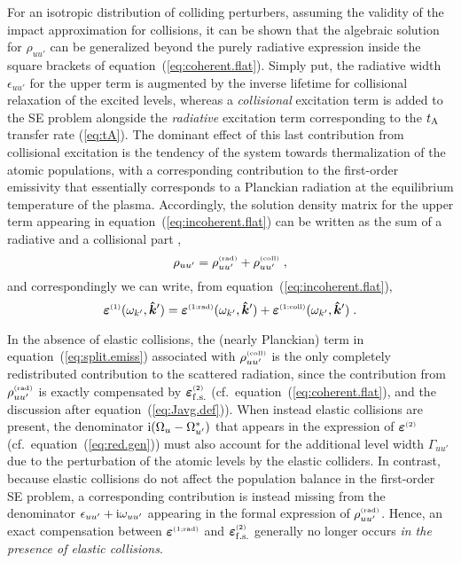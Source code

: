 \documentclass[preprint]{aastex}
\newcommand{\<}{{\kern-5pt}}
\newcommand{\apx}[1]{^{\mbox{\tiny{(#1)}}}}
\begin{document}
For an isotropic 
distribution of colliding perturbers, assuming the validity of the impact
approximation for collisions, it can be shown \cite[see, e.g.,][]{Be13} that 
the algebraic solution for $\rho_{uu'}$ can be generalized beyond the purely 
radiative expression inside the square brackets of 
equation~(\ref{eq:coherent.flat}).
%
Simply put, the radiative width $\epsilon_{uu'}$ for the upper term is augmented 
by the inverse lifetime for collisional relaxation of the excited levels, 
whereas a \emph{collisional} excitation term is added to the SE problem
alongside the \emph{radiative} excitation term corresponding to the $t_{\rm A}$ 
transfer rate (\ref{eq:tA}). The 
dominant effect of this last contribution from collisional excitation is
the tendency of the system towards thermalization of the atomic populations, 
with a corresponding contribution to the first-order emissivity that essentially 
corresponds to a Planckian radiation at the equilibrium temperature of the plasma.
Accordingly, the solution density matrix for the upper term appearing in
equation~(\ref{eq:incoherent.flat}) can be written as the sum of a
radiative and a collisional part \citep{Ca17},
%
\begin{displaymath}
\rho_{uu'}=\rho_{uu'}\apx{rad}+\rho_{uu'}\apx{coll}\;,
\end{displaymath}
%
and correspondingly we can write, from equation~(\ref{eq:incoherent.flat}),
%
\begin{equation} \label{eq:split.emiss}
\bm{\varepsilon}\apx{1}(\omega_{k'},\bm{\hat k}')=
\bm{\varepsilon}\apx{1;rad}(\omega_{k'},\bm{\hat k}')
+\bm{\varepsilon}\apx{1;coll}(\omega_{k'},\bm{\hat k}')\;.
\end{equation}
%

In the absence of elastic collisions, 
the (nearly Planckian) term in 
equation~(\ref{eq:split.emiss}) associated with $\rho_{uu'}\apx{coll}$ 
is the only completely redistributed contribution to the scattered radiation, 
since the contribution from $\rho_{uu'}\apx{rad}$ is exactly compensated
by $\bm{\varepsilon}\apx{2}_{\rm f.s.}$ (cf.\ 
equation~(\ref{eq:coherent.flat}), and the discussion after
equation~(\ref{eq:Javg.def})).
%
When instead elastic collisions are present, the denominator
${\rm i}(\Omega_u-\Omega_{u'}^\ast)$ that 
appears in the expression of $\bm{\varepsilon}\apx{2}$ (cf.\
equation~(\ref{eq:red.gen})) must also account for the
additional level width $\Gamma_{uu'}$ due to the perturbation of the atomic 
levels by the elastic colliders.
%
In contrast, because elastic collisions do not affect the population 
balance in the first-order SE problem, a corresponding contribution is 
instead missing from the denominator $\epsilon_{uu'}+{\rm i}\omega_{uu'}$ 
appearing in the formal expression of
$\rho_{uu'}\apx{rad}$. Hence, an exact compensation between
$\bm{\varepsilon}\apx{1;rad}$ and $\bm{\varepsilon}\apx{2}_{\rm f.s.}$ generally 
no longer occurs \emph{in the presence of elastic collisions}. 
\end{document}
